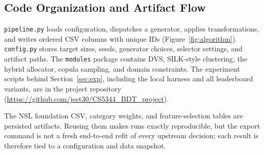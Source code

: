 \documentclass[10pt,a4paper]{article}
\begin{document}
\subsection{Code Organization and Artifact Flow}
\texttt{pipeline.py} loads configuration, dispatches a generator, applies transformations, and writes ordered CSV columns with unique IDs (Figure~\ref{fig:algorithm}). \texttt{config.py} stores target sizes, seeds, generator choices, selector settings, and artifact paths. The \texttt{modules} package contains DVS, SILK-style clustering, the hybrid allocator, copula sampling, and domain constraints. The experiment scripts behind Section~\ref{sec:exp}, including the local harness and all leaderboard variants, are in the project repository (\url{https://github.com/jeet30/CS5344_BDT_project}).

The NSL foundation CSV, category weights, and feature-selection tables are persisted artifacts. Reusing them makes runs exactly reproducible, but the export command is not a fresh end-to-end refit of every upstream decision; each result is therefore tied to a configuration and data snapshot.
\end{document}
